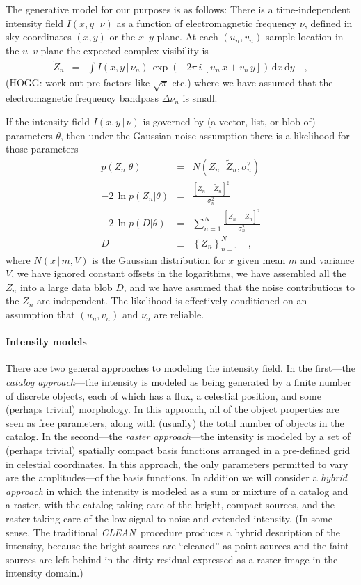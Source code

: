 \documentclass[12pt]{article}
\newcommand{\project}[1]{\textsl{#1}}
\newcommand{\CLEAN}{\project{CLEAN}}
\newcommand{\set}[1]{\left\{{#1}\right\}}
\newcommand{\given}{\,|\,}
\newcommand{\expectation}[1]{\tilde{#1}}
\newcommand{\dd}{\mathrm{d}}
\newcommand{\normal}{N}
\begin{document}
The generative model for our purposes is as follows: There is a
time-independent intensity field $I(x,y\given\nu)$ as a function of
electromagnetic frequency $\nu$, defined in sky coordinates $(x,y)$ or
the $x$--$y$ plane.  At each $(u_n, v_n)$ sample location in the
$u$--$v$ plane the expected complex visibility is
\begin{eqnarray}
\expectation{Z}_n &=& \int I(x,y\given\nu_n)\,\exp(-2\pi\,i\,[u_n\,x + v_n\,y])\,\dd x\,\dd y
\quad ,
\end{eqnarray}
(HOGG: work out pre-factors like $\sqrt{\pi}$ etc.) where we have
assumed that the electromagnetic frequency bandpass $\Delta\nu_n$ is
small.

If the intensity field $I(x,y\given\nu)$ is governed by (a vector,
list, or blob of) parameters $\theta$, then under the Gaussian-noise
assumption there is a likelihood for those parameters
\begin{eqnarray}
p(Z_n|\theta) &=& \normal(Z_n\given\expectation{Z}_n,\sigma_n^2)
\\
-2\,\ln p(Z_n|\theta) &=& \frac{[Z_n - \expectation{Z}_n]^2}{\sigma_n^2}
\\
-2\,\ln p(D|\theta) &=& \sum_{n=1}^N \frac{[Z_n - \expectation{Z}_n]^2}{\sigma_n^2}
\\
D &\equiv& \set{Z_n}_{n=1}^N
\quad ,
\end{eqnarray}
where $\normal(x\given m,V)$ is the Gaussian distribution for $x$
given mean $m$ and variance $V$, we have ignored constant offsets in
the logarithms, we have assembled all the $Z_n$ into a large data blob
$D$, and we have assumed that the noise contributions to the $Z_n$ are
independent.  The likelihood is effectively conditioned on an
assumption that $(u_n, v_n)$ and $\nu_n$ are reliable.

\paragraph{Intensity models}

There are two general approaches to modeling the intensity field.  In
the first---the \emph{catalog approach}---the intensity is modeled as
being generated by a finite number of discrete objects, each of which
has a flux, a celestial position, and some (perhaps trivial)
morphology.  In this approach, all of the object properties are seen
as free parameters, along with (usually) the total number of objects
in the catalog.  In the second---the \emph{raster approach}---the
intensity is modeled by a set of (perhaps trivial) spatially compact
basis functions arranged in a pre-defined grid in celestial
coordinates.  In this approach, the only parameters permitted to vary
are the amplitudes---of the basis functions.  In addition we will
consider a \emph{hybrid approach} in which the intensity is modeled as
a sum or mixture of a catalog and a raster, with the catalog taking
care of the bright, compact sources, and the raster taking care of the
low-signal-to-noise and extended intensity.  (In some sense, The
traditional \CLEAN\ procedure produces a hybrid description of the
intensity, because the bright sources are ``cleaned'' as point sources
and the faint sources are left behind in the dirty residual expressed
as a raster image in the intensity domain.)
\end{document}
